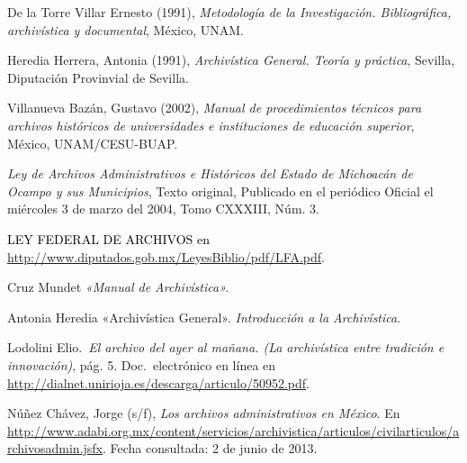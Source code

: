 De la Torre Villar Ernesto (1991), \textit{Metodología de la Investigación.
Bibliográfica, archivística y documental}, México, UNAM.


Heredia Herrera, Antonia (1991), \textit{Archivística General. Teoría y 
práctica}, Sevilla, Diputación Provinvial de Sevilla. 

Villanueva Bazán, Gustavo (2002), \textit{Manual de procedimientos técnicos para
archivos históricos de universidades e instituciones de educación superior}, 
México, UNAM\slash{}CESU-BUAP. 

\medskip
{}

\textit{Ley de Archivos Administrativos e Históricos del Estado de Michoacán de
Ocampo y sus Municipios}, Texto original, Publicado en el periódico Oficial 
el miércoles 3 de marzo del 2004, Tomo CXXXIII, Núm\@. 3.

\medskip
{}

\begin{sloppypar}
\textcolor{black}{LEY FEDERAL DE ARCHIVOS en}
\url{http://www.diputados.gob.mx/LeyesBiblio/pdf/LFA.pdf}.
\end{sloppypar}

Cruz Mundet \textit{«Manual de Archivística».}

Antonia Heredia «Archivística General». \textit{Introducción a la Archivística}.

Lodolini Elio.\, \textit{El archivo del ayer al mañana. (La archivística entre 
tradición e innovación)}, pág. 5\@. Doc.\ electrónico en línea en 
\url{http://dialnet.unirioja.es/descarga/articulo/50952.pdf}.

\begin{sloppypar}
Núñez Chávez, Jorge (s\slash{}f), \textit{Los archivos administrativos en México}. En
\url{http://www.adabi.org.mx/content/servicios/archivistica/articulos/civilarticulos/archivosadmin.jsfx}.
Fecha consultada: 2 de junio de 2013.
\end{sloppypar}


